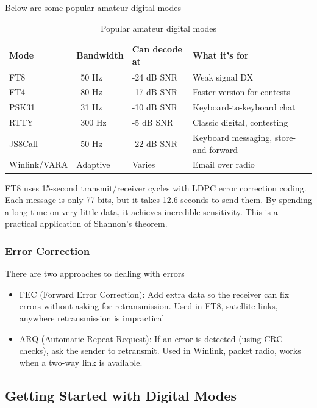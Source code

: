 \documentclass{article}
\begin{document}
Below are some popular amateur digital modes
\begin{table}[h]
    \centering
    \caption{Popular amateur digital modes}
    \label{tab:15}
    \begin{tabular}{l|l|l|l}
        Mode & Bandwidth & Can decode at & What it's for \\
        \hline
        \hline
        FT8 & ~50 Hz & -24 dB SNR & Weak signal DX \\
        FT4 & ~80 Hz & -17 dB SNR & Faster version for contests \\
        PSK31 & ~31 Hz & -10 dB SNR & Keyboard-to-keyboard chat \\
        RTTY & ~300 Hz & -5 dB SNR & Classic digital, contesting \\
        JS8Call & ~50 Hz & -22 dB SNR & Keyboard messaging, store-and-forward \\
        Winlink/VARA & Adaptive & Varies & Email over radio
    \end{tabular}
\end{table}

FT8 uses 15-second transmit/receiver cycles with LDPC error correction coding. Each message is only 77 bits, but it takes 12.6 seconds to send them. By spending a long time on very little data, it achieves incredible sensitivity. This is a practical application of Shannon's theorem.

\subsubsection{Error Correction}
There are two approaches to dealing with errors
\begin{itemize}
    \item FEC (Forward Error Correction): Add extra data so the receiver can fix errors without asking for retransmission. Used in FT8, satellite links, anywhere retransmission is impractical
    \item ARQ (Automatic Repeat Request): If an error is detected (using CRC checks), ask the sender to retransmit. Used in Winlink, packet radio, works when a two-way link is available.
\end{itemize}

\subsection{Getting Started with Digital Modes}
\end{document}
